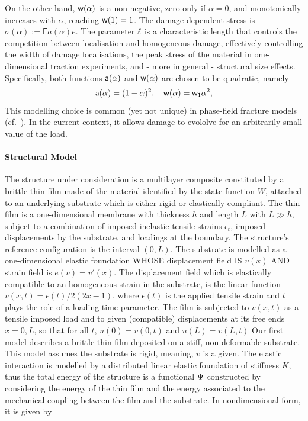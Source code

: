 On the other hand, $\mathsf{w}(\alpha)$ is a non-negative, zero only if $\alpha=0$, and monotonically increases with $\alpha$, reaching $\mathsf{w}(1)=1$. 
The damage-dependent stress is $\sigma(\alpha):=\mathsf{E}a(\alpha) e$. The parameter $\ell$ is a characteristic length that controls the competition between localisation and homogeneous damage, effectively controlling the width of damage localisations, the peak stress of the material in one-dimensional traction experiments, and - more in general - structural size effects.
Specifically, both functions $\mathsf{a}(\alpha)$  
 and $\mathsf{w}(\alpha)$ are chosen to be quadratic, namely 
\begin{equation}
    \label{def:constitutive_functions}
    \mathsf{a}(\alpha) = (1-\alpha)^2, \quad \mathsf{w}(\alpha) = \mathsf{w_1}\alpha^2,
\end{equation}
This modelling choice is common (yet not unique) in phase-field fracture models (cf.~\cite{Bourdin2000-pc,Miehe2010-sj,Miehe2010-ja}). In the current context, it allows damage to evololve for an arbitrarily small value of the load. 




\paragraph{Structural Model}
The structure under consideration is a multilayer composite constituted by a brittle thin film  made of the material identified by the state function $W$, attached to an underlying substrate which is either rigid or elastically compliant. The thin film is a one-dimensional membrane with thickness $h$ and length $L$ with $L\gg h$, subject to a combination of imposed inelastic tensile strains $\bar\epsilon_t$, imposed displacements by the substrate, and loadings at the boundary. The structure's reference configuration is the interval $(0, L)$. 
% 
The substrate is modelled as a one-dimensional elastic foundation WHOSE displacement field IS $v(x)$ AND strain field is $e(v) = v'(x)$. 
% 
The displacement field which is elastically compatible to an homogeneous strain in the substrate, is the linear function $v(x, t) = \bar\epsilon(t)/2 (2x-1)$, where $\bar\epsilon(t)$ is the applied tensile strain and $t$ plays the role of a loading time parameter. 
% 
The film is subjected to $v(x, t)$ as a tensile imposed load and to given (compatible) displacements at its free ends $x = 0, L$, so that for all $t$, $u(0)=v(0, t)$ and $u(L)=v(L, t)$
% 
Our first model describes a brittle thin film deposited on a stiff, non-deformable substrate. This model assumes the substrate is rigid, meaning, $v$ is a given. The elastic interaction is modelled by a distributed linear elastic foundation of stiffness $K$, thus
the total energy of the structure is a functional $\Psi$ constructed by considering the energy of the thin film and the energy associated to the mechanical coupling between the film and the substrate. In nondimensional form, it is given by

